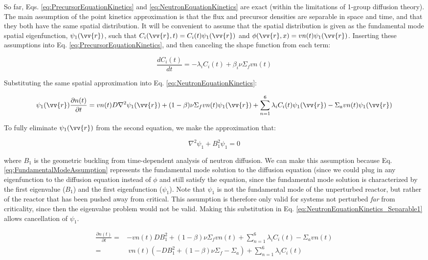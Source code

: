 \documentclass[10pt]{article}
\newcommand{\beq}{\begin{equation}}
\newcommand{\eeq}{\end{equation}}
\newcommand{\beqa}{\begin{equation}\begin{aligned}}
\newcommand{\eeqa}{\end{aligned}\end{equation}}
\begin{document}
\begin{flushleft}
So far, Eqs. \ref{eq:PrecursorEquationKinetics} and \ref{eq:NeutronEquationKinetics} are exact (within the limitations of 1-group diffusion theory). The main assumption of the point kinetics approximation is that the flux and precursor densities are separable in space and time, and that they both have the same spatial distribution. It will be convenient to assume that the spatial distribution is given as the fundamental mode spatial eigenfunction, \(\psi_1(\vv{r})\), such that \(C_i(\vv{r},t) = C_i(t)\psi_1(\vv{r})\) and \(\phi(\vv{r},x)=vn(t)\psi_1(\vv{r})\). Inserting these assumptions into Eq. \ref{eq:PrecursorEquationKinetics}, and then canceling the shape function from each term:

\beq
\label{eq:PrecursorEquationKinetics_Separable1}
\frac{dC_i(t)}{dt}=-\lambda_i C_i(t) + \beta_i \nu\Sigma_f vn(t)
\eeq

Substituting the same spatial approximation into Eq. \ref{eq:NeutronEquationKinetics}:

\beq
\label{eq:NeutronEquationKinetics_Separable1}
\psi_1(\vv{r})\frac{\partial n(t)}{\partial t}=vn(t)D\nabla^2\psi_1(\vv{r}) + (1-\beta)\nu\Sigma_fvn(t)\psi_1(\vv{r}) + \sum_{n=1}^{6} \lambda_i C_i(t)\psi_1(\vv{r}) -\Sigma_avn(t)\psi_1(\vv{r})
\eeq

To fully eliminate \(\psi_1(\vv{r})\) from the second equation, we make the approximation that:

\beq
\label{eq:FundamentalModeAssumption}
\nabla^2\psi_1+B_{1}^{2}\psi_1=0
\eeq

where \(B_1\) is the geometric buckling from time-dependent analysis of neutron diffusion. We can make this assumption because Eq. \ref{eq:FundamentalModeAssumption} represents the fundamental mode solution to the diffusion equation (since we could plug in any eigenfunction to the diffusion equation instead of \(\phi\) and still satisfy the equation, since the fundamental mode solution is characterized by the first eigenvalue (\(B_1\)) and the first eigenfunction (\(\psi_1\)). Note that \(\psi_1\) is not the fundamental mode of the unperturbed reactor, but rather of the reactor that has been pushed away from critical. This assumption is therefore only valid for systems not perturbed {\it far} from criticality, since then the eigenvalue problem would not be valid. Making this substitution in Eq. \ref{eq:NeutronEquationKinetics_Separable1} allows cancellation of \(\psi_1\).

\beqa
\label{eq:NeutronEquationKinetics_Separable2}
\frac{\partial n(t)}{\partial t}=&-vn(t)DB_1^2 + (1-\beta)\nu\Sigma_fvn(t) + \sum_{n=1}^{6} \lambda_i C_i(t) -\Sigma_avn(t)\\
=&\ vn(t)\left(-DB_1^2 + (1-\beta)\nu\Sigma_f-\Sigma_a\right) + \sum_{n=1}^{6} \lambda_i C_i(t)\\
\eeqa


\end{flushleft}
\end{document}
